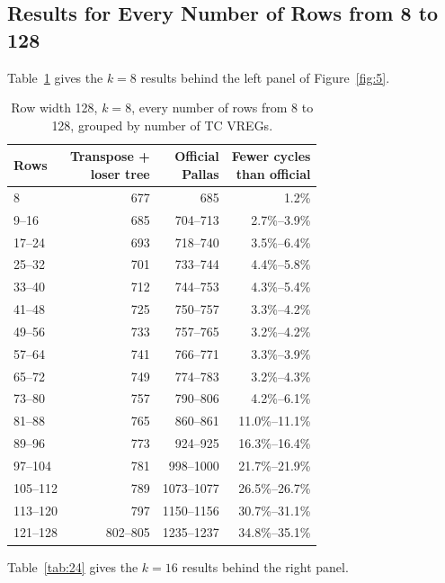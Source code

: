 \documentclass[sigconf,nonacm,balance=false]{acmart}
\begin{document}
\subsection{Results for Every Number of Rows from 8 to 128}
\label{sec:C.5}

Table~\ref{tab:23} gives the $k = 8$ results behind the left panel of Figure~\ref{fig:5}.

\begin{table}
\centering
\caption{Row width 128, $k = 8$, every number of rows from 8 to 128, grouped by number of TC VREGs.}
\label{tab:23}
\begin{tabular}{lrrr}
\toprule
Rows & \makecell[rb]{Transpose +\\loser tree} & \makecell[rb]{Official\\Pallas} & \makecell[rb]{Fewer cycles\\than official} \\
\midrule
8 & 677 & 685 & 1.2\% \\
9--16 & 685 & 704--713 & 2.7\%--3.9\% \\
17--24 & 693 & 718--740 & 3.5\%--6.4\% \\
25--32 & 701 & 733--744 & 4.4\%--5.8\% \\
33--40 & 712 & 744--753 & 4.3\%--5.4\% \\
41--48 & 725 & 750--757 & 3.3\%--4.2\% \\
49--56 & 733 & 757--765 & 3.2\%--4.2\% \\
57--64 & 741 & 766--771 & 3.3\%--3.9\% \\
65--72 & 749 & 774--783 & 3.2\%--4.3\% \\
73--80 & 757 & 790--806 & 4.2\%--6.1\% \\
81--88 & 765 & 860--861 & 11.0\%--11.1\% \\
89--96 & 773 & 924--925 & 16.3\%--16.4\% \\
97--104 & 781 & 998--1000 & 21.7\%--21.9\% \\
105--112 & 789 & 1073--1077 & 26.5\%--26.7\% \\
113--120 & 797 & 1150--1156 & 30.7\%--31.1\% \\
121--128 & 802--805 & 1235--1237 & 34.8\%--35.1\% \\
\bottomrule
\end{tabular}
\end{table}

Table~\ref{tab:24} gives the $k = 16$ results behind the right panel.
\end{document}
